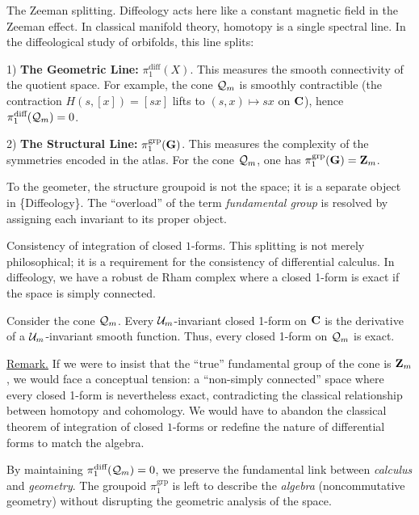 \begin{Article}{The Zeeman splitting.}{}
  Diffeology acts here like a constant magnetic field in the Zeeman effect.
  In classical manifold theory, homotopy is a single spectral line.
  In the diffeological study of orbifolds, this line splits:
  
  1) \textbf{The Geometric Line:} $\pi_1^{\text{diff}}(X)$.
  This measures the smooth connectivity of the quotient space.
  For example, the cone $\mathcal{Q}_m$ is smoothly contractible
  (the contraction $H(s,[x]) = [sx]$ lifts to $(s,x) \mapsto sx$ on $\mathbf{C}$),
  hence $\pi_1^{\text{diff}}(\mathcal{Q}_m) = 0$.
  
  2) \textbf{The Structural Line:} $\pi_1^{\text{grp}}({\mathbf G})$.
  This measures the complexity of the symmetries encoded in the atlas.
  For the cone $\mathcal{Q}_m$, one has $\pi_1^{\text{grp}}({\mathbf G}) = \mathbf{Z}_m$.
  
  To the geometer, the structure groupoid is not the space;
  it is a separate object in \{Diffeology\}.
  The ``overload'' of the term \emph{fundamental group} is resolved by assigning each invariant to its proper object.
\end{Article}

\begin{Article}{Consistency of integration of closed $1$-forms.}{}
  This splitting is not me\-rely philosophical;
  it is a requirement for the consistency of differential calculus.
  In diffeology,
  we have a robust de Rham complex where a closed 1-form is exact if the space is simply connected.
  
  Consider the cone $\mathcal{Q}_m$.
  Every $\mathcal{U}_m$-invariant closed 1-form on $\mathbf{C}$ is the derivative of a $\mathcal{U}_m$-invariant smooth function.
  Thus, every closed 1-form on $\mathcal{Q}_m$ is exact.
  
  \uline{Remark.} If we were to insist that the ``true'' fundamental group of the cone is $\mathbf{Z}_m$,
  we would face a conceptual tension:
  a ``non-simply connected'' space where every closed 1-form is nevertheless exact,
  contradicting the classical relationship between homotopy and cohomology.
  We would have to abandon the classical theorem of integration of closed $1$-forms or redefine the nature of differential forms to match the algebra.
  
  By maintaining $\pi_1^{\text{diff}}(\mathcal{Q}_m) = 0$,
  we preserve the fundamental link between \emph{calculus} and \emph{geometry}.
  The groupoid $\pi_1^{\text{grp}}$ is left to describe the \emph{algebra} (noncommutative geometry)
  without disrupting the geometric analysis of the space.
\end{Article}

